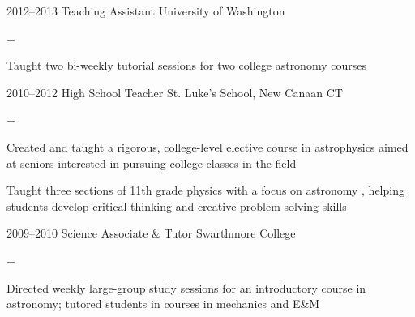 \documentclass[]{luger-cv} %
\begin{document}
\begin{entrylist}

        \entry
        {2012--2013}
        {Teaching Assistant}
        {University of Washington}
        {%
            \vspace{-1em}
            \begin{list}{{\color{numcolor}$-$}}{\cvlist}
                \item Taught two bi-weekly tutorial sessions for two college astronomy courses
            \end{list}
        }


    \fi

    \ifdefined \onepage \else
\end{entrylist}
%
%
\begin{entrylist}
    \fi


    \entry
    {2010--2012}
    {High School Teacher}
    {St. Luke's School, New Canaan CT}
    {%
        \vspace{-1em}
        \begin{list}{{\color{numcolor}$-$}}{\cvlist}
            \item Created and taught a rigorous, college-level elective course in astrophysics
                  aimed at seniors interested in pursuing college classes in the field
            \item Taught three sections of 11th grade physics with a focus on
                  astronomy
                  \ifdefined \onepage \else
                      , helping students develop critical thinking and creative
                      problem solving skills
                  \fi
        \end{list}
    }


    \ifdefined \onepage \else
        \entry
        {2009--2010}
        {Science Associate \& Tutor}
        {Swarthmore College}
        {%
            \vspace{-1em}
            \begin{list}{{\color{numcolor}$-$}}{\cvlist}
                \item Directed weekly large-group study sessions for an introductory course in
                      astronomy; tutored students in courses in mechanics and E\&M
            \end{list}
        }
    \fi


\end{entrylist}
\end{document}
